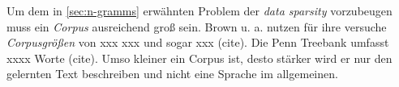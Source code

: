         Um dem in \autoref{sec:n-gramms} erwähnten Problem der \emph{data sparsity} vorzubeugen muss ein \emph{Corpus} ausreichend groß sein. Brown u. a. nutzen für ihre versuche \emph{Corpusgrößen} von xxx xxx und sogar xxx (cite). Die Penn Treebank umfasst xxxx Worte (cite). Umso kleiner ein Corpus ist, desto stärker wird er nur den gelernten Text beschreiben und nicht eine Sprache im allgemeinen.
    \newpage
    
